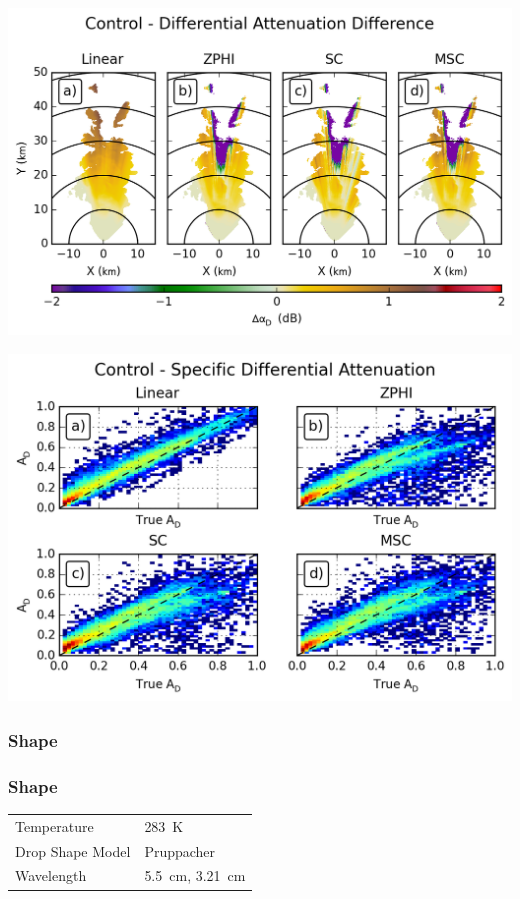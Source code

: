 \documentclass[red]{beamer}
\begin{document}
\begin{frame}
    \begin{center}
        \includegraphics[scale=0.7]{figures/X_Control_Differential_Attenuation_Difference}
    \end{center}
\end{frame}

\begin{frame}
    \begin{center}
        \includegraphics[scale=0.7]{figures/X_Control_Specific_Differential_Attenuation_scatter}
    \end{center}
\end{frame}

\subsubsection{Shape}
\begin{frame}
	\frametitle{Shape}
	\begin{center}
	    \begin{tabular}{ | l | l | }
	        \hline
	        Temperature & \SI{283}{\kelvin} \\
	        Drop Shape Model & Pruppacher \\
	        Wavelength & \SI{5.5}{\centi\meter}, \SI{3.21}{\centi\meter} \\
			\hline
	    \end{tabular}
	\end{center}	
\end{frame}
\end{document}
